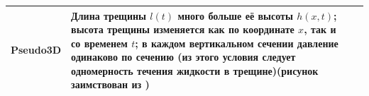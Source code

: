\begin{longtable}[l]{|L{2.2cm}|m{7.3cm}|L{6.2cm}|}
	Pseudo3D&Длина трещины $l(t)$ много больше её высоты $h(x,t)$; высота трещины изменяется как по координате $x$, так и со временем $t$; в каждом вертикальном сечении давление одинаково по сечению (из этого условия следует одномерность течения жидкости в трещине)\break\hfill\break (рисунок заимствован из \cite{baykin_course, dontsov_peirce})&\hfill\break{}\hfill\break\\ \hline

\end{longtable}
